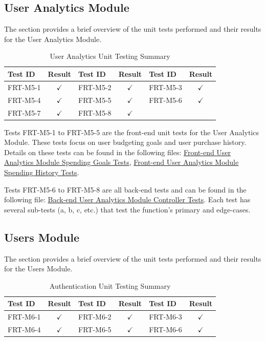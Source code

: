 \documentclass[12pt, titlepage]{article}
\begin{document}
\subsection{User Analytics Module}
The section provides a brief overview of the unit tests performed and their results for the
User Analytics Module.

\begin{longtable}{|l|c|l|c|l|c|}
  \caption{User Analytics Unit Testing Summary} \label{User Analytics Unit Test Summary} \\
  \toprule
  \textbf{Test ID} & \textbf{Result} & \textbf{Test ID} & \textbf{Result} & \textbf{Test ID} & \textbf{Result} \\
  \midrule
  FRT-M5-1 & $\checkmark$ & FRT-M5-2 & $\checkmark$ & FRT-M5-3 & $\checkmark$ \\
  \midrule
  FRT-M5-4 & $\checkmark$ & FRT-M5-5 & $\checkmark$ & FRT-M5-6 & $\checkmark$ \\
  \midrule
  FRT-M5-7 & $\checkmark$ & FRT-M5-8 & $\checkmark$  &  &\\
  \bottomrule
\end{longtable}

Tests FRT-M5-1 to FRT-M5-5 are the front-end unit tests for the User Analytics Module. These tests focus on user budgeting goals and user purchase history. Details on these tests can be found in the following files: \href{https://github.com/allanfang1/grocery_spending_tracker_app/blob/main/test/goals_provider_test.dart}{Front-end User Analytics Module Spending Goals Tests}, \href{https://github.com/allanfang1/grocery_spending_tracker_app/blob/main/test/history_provider_test.dart}{Front-end User Analytics Module Spending History Tests}.

Tests FRT-M5-6 to FRT-M5-8 are all back-end tests and can be found in the following file: \href{https://github.com/grocery-spending-tracker/grocery-spending-tracker-backend/blob/master/tests/controllers/usersController.analytics.test.js}{Back-end User Analytics Module Controller Tests}. Each test has several sub-tests (a, b, c, etc.) that test the function's primary and edge-cases.

\subsection{Users Module}
The section provides a brief overview of the unit tests performed and their results for the
Users Module.
\begin{longtable}{|l|c|l|c|l|c|}
  \caption{Authentication Unit Testing Summary} \label{Authentication Unit Test Summary} \\
  \toprule
  \textbf{Test ID} & \textbf{Result} & \textbf{Test ID} & \textbf{Result} & \textbf{Test ID} & \textbf{Result} \\
  \midrule
  FRT-M6-1 & $\checkmark$ & FRT-M6-2 & $\checkmark$ & FRT-M6-3 & $\checkmark$ \\
  \midrule
  FRT-M6-4 & $\checkmark$ & FRT-M6-5 & $\checkmark$ & FRT-M6-6 & $\checkmark$ \\
  \bottomrule
\end{longtable}
\end{document}
